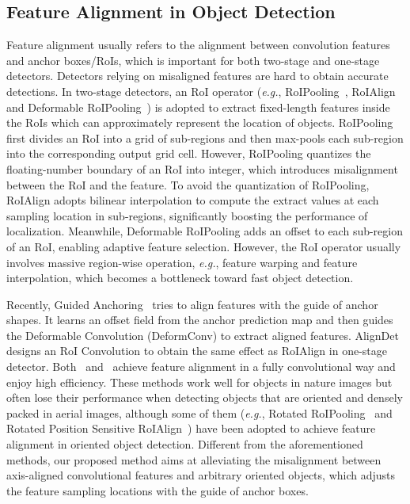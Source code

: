 \documentclass[10pt,journal,final]{IEEEtran}
\def\eg{{\em e.g.}}
\begin{document}
\subsection{Feature Alignment in Object Detection} 
Feature alignment usually refers to the alignment between convolution features and anchor boxes/RoIs, which is important for both two-stage and one-stage detectors. Detectors relying on misaligned features are hard to obtain accurate detections. In two-stage detectors, an RoI operator (\eg, RoIPooling~\cite{girshick2015fast}, RoIAlign~\cite{he2017maskrcnn} and Deformable RoIPooling~\cite{dai2017dcn}) is adopted to extract fixed-length features inside the RoIs which can approximately represent the location of objects. RoIPooling first divides an RoI into a grid of sub-regions and then max-pools each sub-region into the corresponding output grid cell. However, RoIPooling quantizes the floating-number boundary of an RoI into integer, which introduces misalignment between the RoI and the feature. To avoid the quantization of RoIPooling, RoIAlign adopts bilinear interpolation to compute the extract values at each sampling location in sub-regions, significantly boosting the performance of localization. Meanwhile, Deformable RoIPooling adds an offset to each sub-region of an RoI, enabling adaptive feature selection. However, the RoI operator usually involves massive region-wise operation, \eg, feature warping and feature interpolation, which becomes a bottleneck toward fast object detection. 

Recently, Guided Anchoring~\cite{wang2019region} tries to align features with the guide of anchor shapes. It learns an offset field from the anchor prediction map and then guides the Deformable Convolution (DeformConv) to extract aligned features. AlignDet~\cite{chen2019aligndet} designs an RoI Convolution to obtain the same effect as RoIAlign in one-stage detector. Both~\cite{wang2019region} and~\cite{chen2019aligndet} achieve feature alignment in a fully convolutional way and enjoy high efficiency. These methods work well for objects in nature images but often lose their performance when detecting objects that are oriented and densely packed in aerial images, although some of them (\eg, Rotated RoIPooling~\cite{ma2018arbitrary} and Rotated Position Sensitive RoIAlign~\cite{ding2018transformer}) have been adopted to achieve feature alignment in oriented object detection. Different from the aforementioned methods, our proposed method aims at alleviating the misalignment between axis-aligned convolutional features and arbitrary oriented objects, which adjusts the feature sampling locations with the guide of anchor boxes.
\end{document}
